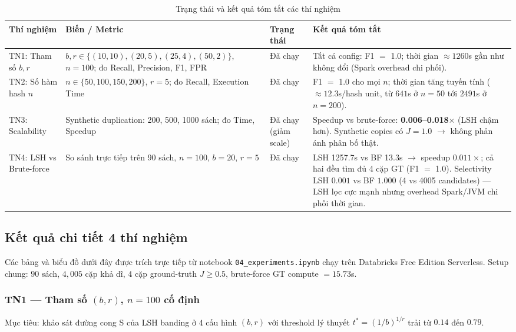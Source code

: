 \begin{table}[h!]
\centering
\caption{Trạng thái và kết quả tóm tắt các thí nghiệm}
\label{tab:experiments}
\begin{tabularx}{\textwidth}{|l|X|l|X|}
\hline
\textbf{Thí nghiệm} & \textbf{Biến / Metric} & \textbf{Trạng thái} & \textbf{Kết quả tóm tắt} \\
\hline
TN1: Tham số $b, r$ & $b, r \in \{(10,10), (20,5), (25,4), (50,2)\}$, $n{=}100$; đo Recall, Precision, F1, FPR & Đã chạy & Tất cả config: F1 $=$ 1.0; thời gian $\approx 1260$s gần như không đổi (Spark overhead chi phối). \\
\hline
TN2: Số hàm hash $n$ & $n \in \{50, 100, 150, 200\}$, $r{=}5$; đo Recall, Execution Time & Đã chạy & F1 $=$ 1.0 cho mọi $n$; thời gian tăng tuyến tính ($\approx 12.3$s/hash unit, từ $641$s ở $n{=}50$ tới $2491$s ở $n{=}200$). \\
\hline
TN3: Scalability & Synthetic duplication: 200, 500, 1000 sách; đo Time, Speedup & Đã chạy (giảm scale) & Speedup vs brute-force: \textbf{0.006--0.018$\times$} (LSH chậm hơn). Synthetic copies có $J{=}1.0$ $\rightarrow$ không phản ánh phân bố thật. \\
\hline
TN4: LSH vs Brute-force & So sánh trực tiếp trên 90 sách, $n{=}100$, $b{=}20$, $r{=}5$ & Đã chạy & LSH 1257.7s vs BF 13.3s $\rightarrow$ speedup $0.011\times$; cả hai đều tìm đủ 4 cặp GT (F1 $=$ 1.0). Selectivity LSH $0.001$ vs BF $1.000$ (4 vs 4005 candidates) --- LSH lọc cực mạnh nhưng overhead Spark/JVM chi phối thời gian. \\
\hline
\end{tabularx}
\end{table}

\subsection{Kết quả chi tiết 4 thí nghiệm}
\label{subsec:tn-results}

Các bảng và biểu đồ dưới đây được trích trực tiếp từ notebook \texttt{04\_experiments.ipynb} chạy trên Databricks Free Edition Serverless. Setup chung: $90$ sách, $4{,}005$ cặp khả dĩ, $4$ cặp ground-truth $J \geq 0.5$, brute-force GT compute $= 15.73$s.

\subsubsection{TN1 --- Tham số $(b, r)$, $n = 100$ cố định}

Mục tiêu: khảo sát đường cong S của LSH banding ở 4 cấu hình $(b, r)$ với threshold lý thuyết $t^{*} = (1/b)^{1/r}$ trải từ $0.14$ đến $0.79$.

